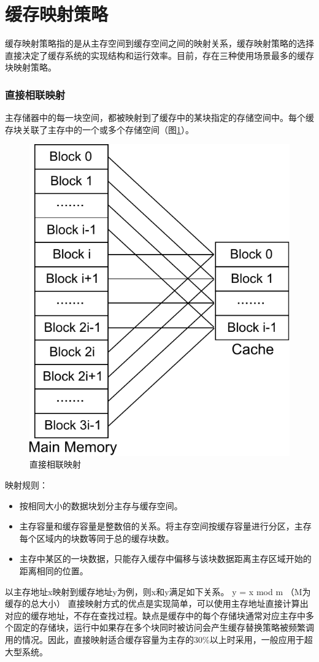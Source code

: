 \section{缓存映射策略}
\label{sec:cache_mapping}

缓存映射策略指的是从主存空间到缓存空间之间的映射关系，缓存映射策略的选择直接决定了缓存系统的实现结构和运行效率。目前，存在三种使用场景最多的缓存块映射策略\cite{cachemap2013}。

\subsubsection{直接相联映射}

主存储器中的每一块空间，都被映射到了缓存中的某块指定的存储空间中。每个缓存块关联了主存中的一个或多个存储空间（图\ref{fig:cache-map-1}）。

\begin{figure}[H]
\centering
\includegraphics[width=0.4\linewidth]{./graph/cache-map-1}
\caption{直接相联映射}
\label{fig:cache-map-1}
\end{figure}

映射规则：
\begin{itemize}
\item 按相同大小的数据块划分主存与缓存空间。
\item 主存容量和缓存容量是整数倍的关系。将主存空间按缓存容量进行分区，主存每个区域内的块数等同于总的缓存块数。 
\item 主存中某区的一块数据，只能存入缓存中偏移与该块数据距离主存区域开始的距离相同的位置。
\end{itemize}

以主存地址x映射到缓存地址y为例，则x和y满足如下关系。
y = x mod m	（M为缓存的总大小）
直接映射方式的优点是实现简单，可以使用主存地址直接计算出对应的缓存地址，不存在查找过程。缺点是缓存中的每个存储块通常对应主存中多个固定的存储块，运行中如果存在多个块同时被访问会产生缓存替换策略被频繁调用的情况。因此，直接映射适合缓存容量为主存的30\%以上时采用，一般应用于超大型系统。

